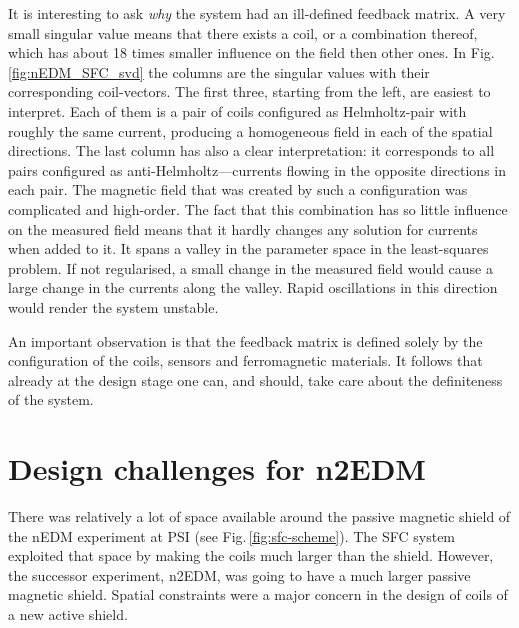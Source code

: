 It is interesting to ask \emph{why} the system had an ill-defined feedback matrix.
A very small singular value means that there exists a coil, or a combination thereof, which has about 18 times smaller influence on the field then other ones.
In Fig.\,\ref{fig:nEDM_SFC_svd} the columns are the singular values with their corresponding coil-vectors.
The first three, starting from the left, are easiest to interpret.
Each of them is a pair of coils configured as Helmholtz-pair with roughly the same current, producing a homogeneous field in each of the spatial directions.
The last column has also a clear interpretation: it corresponds to all pairs configured as anti-Helmholtz---currents flowing in the opposite directions in each pair.
The magnetic field that was created by such a configuration was complicated and high-order.
The fact that this combination has so little influence on the measured field means that it hardly changes any solution for currents when added to it.
It spans a valley in the parameter space in the least-squares problem.
If not regularised, a small change in the measured field would cause a large change in the currents along the valley.
Rapid oscillations in this direction would render the system unstable.

An important observation is that the feedback matrix is defined solely by the configuration of the coils, sensors and ferromagnetic materials.
It follows that already at the design stage one can, and should, take care about the definiteness of the system.




\section{Design challenges for n2EDM}
\label{sec:n2EDM_challenges}
There was relatively a lot of space available around the passive magnetic shield of the nEDM experiment at PSI (see Fig.\,\ref{fig:sfc-scheme}).
The SFC system exploited that space by making the coils much larger than the shield.
However, the successor experiment, n2EDM, was going to have a much larger passive magnetic shield.
Spatial constraints were a major concern in the design of coils of a new active shield.

